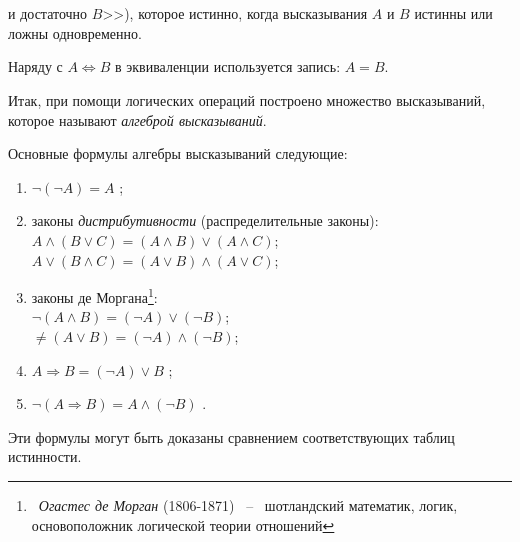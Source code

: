 \documentclass[a4paper,14pt]{article}
\begin{document}
\onehalfspacing
\section*{}
\setcounter{section}{1}
\noindent и достаточно $B$>>), которое истинно, когда высказывания $A$ и $B$ истинны или ложны одновременно.
\par Наряду с $A \Leftrightarrow B$ в эквиваленции используется запись: $A = B$.
\par Итак, при помощи логических операций построено множество высказываний, которое называют \emph{алгеброй высказываний}.
\par Основные формулы алгебры высказываний следующие:
\begin{enumerate}[ref=\arabic{enumi}]
    \item $\neg (\neg A) = A$ \label{enum:1:1};
    \item законы \emph{дистрибутивности} (распределительные законы): \\
          $A \wedge (B \vee C) = (A \wedge B) \vee (A \wedge C)$; \\
          $A \vee (B \wedge C) = (A \vee B) \wedge (A \vee C)$;
    \item законы де Моргана\footnote[2]{\small{~\emph{Огастес де Морган} (1806-1871) ~--~ шотландский математик, логик, основоположник логической теории отношений}}: \\
          $\neg(A \wedge B) = (\neg A) \vee (\neg B)$; \\
          $\neq(A \vee B) = (\neg A) \wedge (\neg B)$;
    \item $A \Rightarrow B = (\neg A) \vee B$ \label{enum:1:4};
    \item $\neg(A \Rightarrow B) = A \wedge (\neg B)$ \label{enum:1:5}.
\end{enumerate}
\par Эти формулы могут быть доказаны сравнением соответствующих таблиц истинности.
\end{document}

